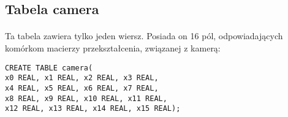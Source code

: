 \subsection{Tabela camera}

\paragraph{}
Ta tabela zawiera tylko jeden wiersz. Posiada on 16 pól, odpowiadających komórkom macierzy przekształcenia, związanej z kamerą:
\begin{verbatim}
CREATE TABLE camera(
x0 REAL, x1 REAL, x2 REAL, x3 REAL,
x4 REAL, x5 REAL, x6 REAL, x7 REAL,
x8 REAL, x9 REAL, x10 REAL, x11 REAL,
x12 REAL, x13 REAL, x14 REAL, x15 REAL);
\end{verbatim}
